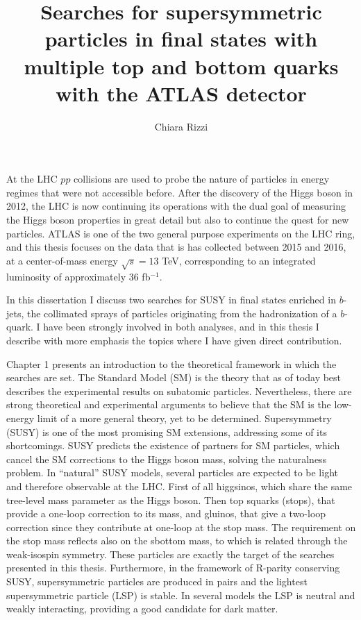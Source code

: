\documentclass[11pt,a4paper]{article}
\title{Searches for supersymmetric particles in final states with multiple top and bottom quarks with the ATLAS detector}
\author{Chiara Rizzi}
\date{}
\newcommand{\cmtre}{\ensuremath{\sqrt{s}  =  13}\xspace}
\def\ifb{\mbox{fb$^{-1}$}} %
\begin{document}
\maketitle

At the LHC $pp$ collisions are used to probe the nature of particles in energy regimes that were not accessible before. 
After the discovery of the Higgs boson in 2012, the LHC is now continuing its operations with the dual goal 
of measuring the Higgs boson properties in great detail but also to continue the quest for new particles.
ATLAS is one of the two general purpose experiments on the LHC ring, and this thesis focuses on the data that is has collected between 
2015 and 2016, 
at a center-of-mass energy \cmtre TeV, corresponding to an 
integrated luminosity of approximately 36 \ifb. 

In this dissertation I discuss two searches for SUSY in final states enriched in $b$-jets, the collimated sprays of 
particles originating from the hadronization of a $b$-quark. 
I have been strongly involved in both analyses, 
and in this thesis I describe with more emphasis the topics where I have given direct contribution.

Chapter 1 presents an introduction to the theoretical framework in which the searches are set. 
The Standard Model (SM) is the theory that as of today best describes the experimental results on subatomic particles. 
Nevertheless, there are strong theoretical and experimental arguments to believe that the SM is the low-energy limit 
of a more general theory, yet to be determined. 
Supersymmetry (SUSY) is one of the most promising SM extensions, 
addressing some of its shortcomings. SUSY predicts the existence of partners for  
SM particles, which cancel the SM corrections to the Higgs boson mass, solving the naturalness problem. 
In ``natural'' SUSY models, several particles are expected to be light and therefore observable at the LHC.
First of all higgsinos, which share the same tree-level mass parameter as the Higgs boson. 
Then top squarks (stops), that provide a one-loop correction to its mass, and gluinos, that give a two-loop correction since they contribute 
at one-loop at the stop mass. 
The requirement on the stop mass reflects also on the sbottom mass, to which is related through the weak-isospin symmetry. 
These particles are exactly the target of the searches presented in this thesis.
Furthermore, in the framework of R-parity conserving SUSY, supersymmetric particles are produced in pairs and the 
lightest supersymmetric particle (LSP) is stable. 
In several models the LSP is neutral and weakly interacting, providing a good candidate for dark matter.
 
\end{document}
